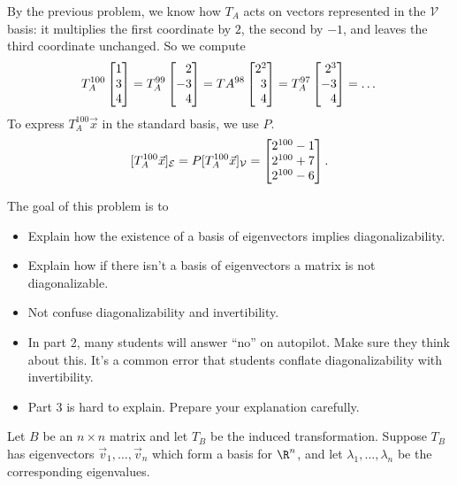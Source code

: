 \begin{parts}
\begin{solution}
				By the previous problem, we know how $T_A$ acts on vectors represented
				in the $\mathcal V$ basis: it multiplies the first coordinate by
				$2$, the second by $-1$, and leaves the third coordinate unchanged.
				So we compute
				\[
					T_A^{100}\mat{1\\3\\4}
					=T_A^{99}\mat{2\\-3\\4}
					=TA^{98}\mat{2^2\\3\\4}
					=T_A^{97}\mat{2^3\\-3\\4}
					=\dots
				\]
				To express $T_A^{100}\vec x$ in the standard basis, we use $P$.
				\[
					[T_A^{100}\vec x]_{\mathcal E} = P[T_A^{100}\vec x]_{\mathcal V} = \mat{2^{100}-1\\2^{100}+7\\2^{100}-6}.
				\]
			\end{solution}
	\end{parts}


	\bookonlynewpage
	\question
	\begin{annotation}
		\begin{goals}

			The goal of this problem is to
			\begin{itemize}
				\item Explain how the existence of a basis of eigenvectors implies diagonalizability.
				\item Explain how if there isn't a basis of eigenvectors a matrix is not diagonalizable.
				\item Not confuse diagonalizability and invertibility.
			\end{itemize}
		\end{goals}

		\begin{notes}
			\begin{itemize}
				\item In part 2, many students will answer ``no'' on autopilot. Make
					sure they think about this. It's a common error that students
					conflate diagonalizability with invertibility.
				\item Part 3 is hard to explain. Prepare your explanation carefully.
			\end{itemize}
		\end{notes}
	\end{annotation}
	Let $B$ be an $n\times n$ matrix and let $T_B$ be the induced transformation.
	Suppose $T_B$ has eigenvectors $\vec v_1,\ldots, \vec v_n$ which
	form a basis for $\R^n$, and let $\lambda_1,\ldots,\lambda_n$ be the corresponding
	eigenvalues.


